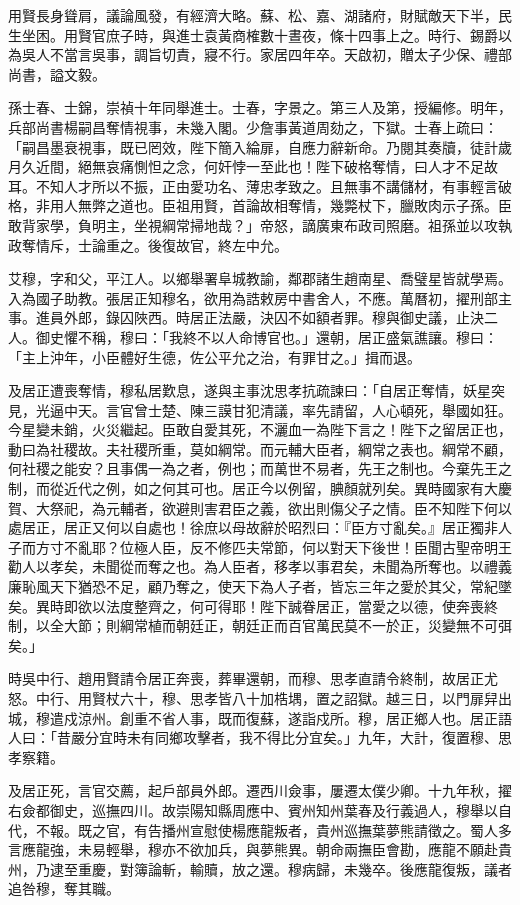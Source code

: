 \begin{pinyinscope}
用賢長身聳肩，議論風發，有經濟大略。蘇、松、嘉、湖諸府，財賦敵天下半，民生坐困。用賢官庶子時，與進士袁黃商榷數十晝夜，條十四事上之。時行、錫爵以為吳人不當言吳事，調旨切責，寢不行。家居四年卒。天啟初，贈太子少保、禮部尚書，謚文毅。

孫士春、士錦，崇禎十年同舉進士。士春，字景之。第三人及第，授編修。明年，兵部尚書楊嗣昌奪情視事，未幾入閣。少詹事黃道周劾之，下獄。士春上疏曰：「嗣昌墨衰視事，既已罔效，陛下簡入綸扉，自應力辭新命。乃閱其奏牘，徒計歲月久近間，絕無哀痛惻怛之念，何奸悖一至此也！陛下破格奪情，曰人才不足故耳。不知人才所以不振，正由愛功名、薄忠孝致之。且無事不講儲材，有事輕言破格，非用人無弊之道也。臣祖用賢，首論故相奪情，幾斃杖下，臘敗肉示子孫。臣敢背家學，負明主，坐視綱常掃地哉？」帝怒，謫廣東布政司照磨。祖孫並以攻執政奪情斥，士論重之。後復故官，終左中允。

艾穆，字和父，平江人。以鄉舉署阜城教諭，鄰郡諸生趙南星、喬璧星皆就學焉。入為國子助教。張居正知穆名，欲用為誥敕房中書舍人，不應。萬曆初，擢刑部主事。進員外郎，錄囚陜西。時居正法嚴，決囚不如額者罪。穆與御史議，止決二人。御史懼不稱，穆曰：「我終不以人命博官也。」還朝，居正盛氣譙讓。穆曰：「主上沖年，小臣體好生德，佐公平允之治，有罪甘之。」揖而退。

及居正遭喪奪情，穆私居歎息，遂與主事沈思孝抗疏諫曰：「自居正奪情，妖星突見，光逼中天。言官曾士楚、陳三謨甘犯清議，率先請留，人心頓死，舉國如狂。今星變未銷，火災繼起。臣敢自愛其死，不灑血一為陛下言之！陛下之留居正也，動曰為社稷故。夫社稷所重，莫如綱常。而元輔大臣者，綱常之表也。綱常不顧，何社稷之能安？且事偶一為之者，例也；而萬世不易者，先王之制也。今棄先王之制，而從近代之例，如之何其可也。居正今以例留，腆顏就列矣。異時國家有大慶賀、大祭祀，為元輔者，欲避則害君臣之義，欲出則傷父子之情。臣不知陛下何以處居正，居正又何以自處也！徐庶以母故辭於昭烈曰：『臣方寸亂矣。』居正獨非人子而方寸不亂耶？位極人臣，反不修匹夫常節，何以對天下後世！臣聞古聖帝明王勸人以孝矣，未聞從而奪之也。為人臣者，移孝以事君矣，未聞為所奪也。以禮義廉恥風天下猶恐不足，顧乃奪之，使天下為人子者，皆忘三年之愛於其父，常紀墜矣。異時即欲以法度整齊之，何可得耶！陛下誠眷居正，當愛之以德，使奔喪終制，以全大節；則綱常植而朝廷正，朝廷正而百官萬民莫不一於正，災變無不可弭矣。」

時吳中行、趙用賢請令居正奔喪，葬畢還朝，而穆、思孝直請令終制，故居正尤怒。中行、用賢杖六十，穆、思孝皆八十加梏堣，置之詔獄。越三日，以門扉舁出城，穆遣戍涼州。創重不省人事，既而復蘇，遂詣戍所。穆，居正鄉人也。居正語人曰：「昔嚴分宜時未有同鄉攻擊者，我不得比分宜矣。」九年，大計，復置穆、思孝察籍。

及居正死，言官交薦，起戶部員外郎。遷西川僉事，屢遷太僕少卿。十九年秋，擢右僉都御史，巡撫四川。故崇陽知縣周應中、賓州知州葉春及行義過人，穆舉以自代，不報。既之官，有告播州宣慰使楊應龍叛者，貴州巡撫葉夢熊請徵之。蜀人多言應龍強，未易輕舉，穆亦不欲加兵，與夢熊異。朝命兩撫臣會勘，應龍不願赴貴州，乃逮至重慶，對簿論斬，輸贖，放之還。穆病歸，未幾卒。後應龍復叛，議者追咎穆，奪其職。


\end{pinyinscope}
